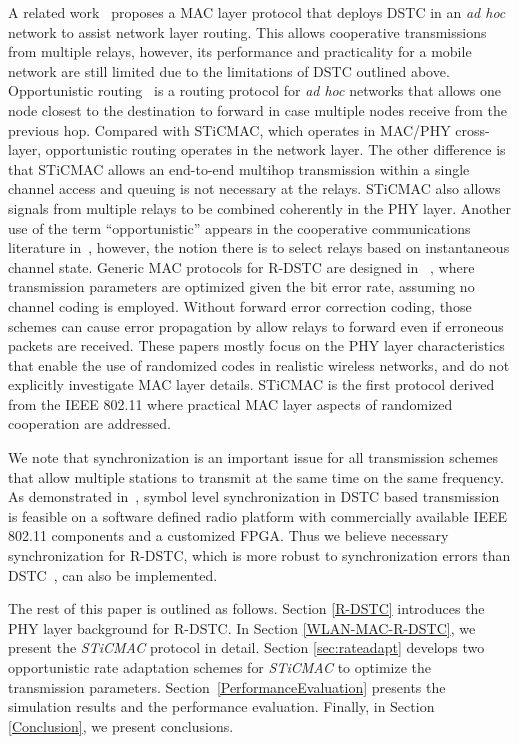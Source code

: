 \documentclass[peerreview,draftcls,onecolumn,12pt,a4paper]{IEEEtran}
\begin{document}
A related work~\cite{Jakllari06} proposes a MAC layer protocol that deploys DSTC in an \emph{ad hoc} network to assist network layer routing. This allows cooperative transmissions from multiple relays, however, its performance and practicality for a mobile network are still limited due to the limitations of DSTC outlined above. Opportunistic routing~\cite{opprouting} is a routing protocol for \emph{ad hoc} networks that allows one node closest to the destination to forward in case multiple nodes receive from the previous hop. Compared with STiCMAC, which  operates in MAC/PHY cross-layer, opportunistic routing operates in the network layer. The other difference is that STiCMAC allows an end-to-end multihop transmission within a single channel access and queuing is not necessary at the relays. STiCMAC also allows signals from multiple relays to be combined coherently in the PHY layer. Another use of the term ``opportunistic'' appears in the cooperative communications literature in~\cite{pathselect}, however, the notion there is to select relays based on instantaneous channel state. Generic MAC protocols for R-DSTC are designed in ~\cite{peiGlobecom08, RcoopMAC}, where transmission parameters are optimized given the bit error rate, assuming no channel coding is employed. Without forward error correction coding, those schemes can cause error propagation by allow relays to forward even if erroneous packets are received. These papers mostly focus on the PHY layer characteristics that enable the use of randomized codes in realistic wireless networks, and do not explicitly investigate MAC layer details. STiCMAC is the first protocol derived from the IEEE 802.11 where practical MAC layer aspects of randomized cooperation are addressed.

We note that synchronization is an important issue for all transmission schemes that allow multiple stations to transmit at the same time on the same frequency. As demonstrated in~\cite{MurphayDSTC}, symbol level synchronization in DSTC based transmission is feasible on a software defined radio platform with commercially available IEEE 802.11 components and a customized FPGA. Thus we believe necessary synchronization for R-DSTC, which is more robust to synchronization errors than DSTC~\cite{Sharp2008}, can also be implemented.



The rest of this paper is outlined as follows. Section
\ref{R-DSTC} introduces the PHY layer background for R-DSTC. In
Section \ref{WLAN-MAC-R-DSTC}, we present the \emph{STiCMAC}
protocol in detail. Section \ref{sec:rateadapt} develops two
opportunistic rate adaptation schemes for \emph{STiCMAC} to
optimize the transmission parameters.
Section~\ref{PerformanceEvaluation} presents the simulation
results and the performance evaluation. Finally, in Section
\ref{Conclusion}, we present conclusions.
\end{document}
